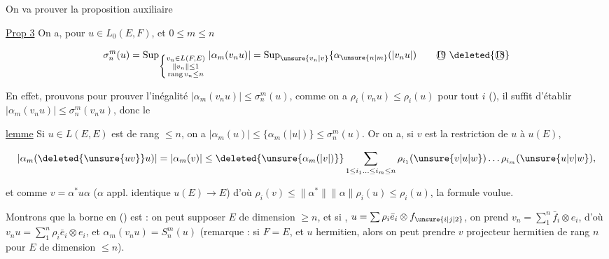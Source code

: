 On va prouver la proposition auxiliaire

\uline{Prop 3} On a, pour $u\in L_0(E,F)$, et $0\leq m\leq n$

\[
\sigma_n^m(u)=\operatorname{Sup}_{\left\{\substack{v_n\in L(F,E)\\\lVert v_n\rVert\leq1\\\operatorname{rang}v_n\leq n}\right.}|\alpha_m(v_nu)|=\operatorname{Sup}_{\unsure{v_n|v}}\{\alpha_{\unsure{n|m}}(|v_nu|)\tag*{\textcircled{19}\ \deleted{\textcircled{18}}}
\]


En effet, prouvons   pour prouver l'inégalité  $|\alpha_m(v_nu)|\leq\sigma_n^m(u)$, comme on a $\rho_i(v_nu)\leq\rho_i(u)$ pour tout $i$ (\unsure{---}), il suffit d'établir $|\alpha_m(v_nu)|\leq\sigma_n^m(v_nu)$, donc le

\uline{lemme} Si $u\in L(E,E)$ est de rang $\leq n$, on a $|\alpha_m(u)|\leq\{\alpha_m(|u|)\}\leq\sigma_n^m(u)$. Or on a, si $v$ est la restriction de $u$ à $u(E)$, 

\[
|\alpha_m(\deleted{\unsure{uv}}u)|=|\alpha_m(v)|\leq\deleted{\unsure{\alpha_m(|v|)}}\sum_{1\leq i_1\ldots\leq i_m\leq n}\rho_{i_1}(\unsure{v|u|w})\ldots\rho_{i_m}(\unsure{u|v|w}),
\]

et comme  $v=\alpha^*u\alpha$ ($\alpha$ appl. identique $u(E)\longrightarrow E$) d'où $\rho_i(v)\leq\lVert\alpha^*\rVert\lVert\alpha\rVert\rho_i(u)\leq\rho_i(u)$, la formule voulue.


 Montrons que la borne en () est  : on peut supposer $E$ de dimension $\geq n$,  et si , $u=\sum\rho_i\bar e_i\otimes f_{\unsure{i|j|2}}$, on prend $v_n=\sum_1^n\bar f_i\otimes e_i$, d'où $v_nu=\sum_1^n\rho_i\bar e_i\otimes e_i$, et $\alpha_m(v_nu)=S_n^m(u)$ (remarque : si $F=E$, et $u$ hermitien, alors on peut prendre $v$ projecteur hermitien de rang $n$ pour $E$ de dimension $\leq n$).


